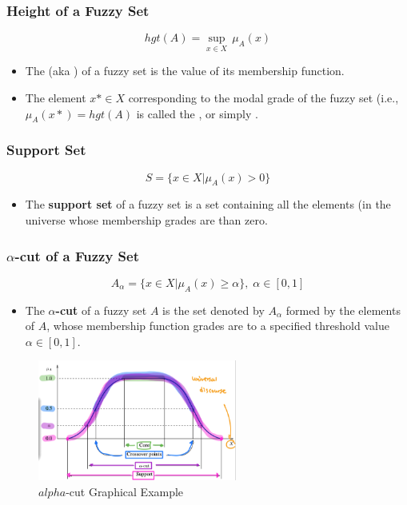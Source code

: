 \documentclass{tron}
\newcommand{\squeezeup}{\vspace{-2.5 mm}}
\begin{document}
\subsubsection{Height of a Fuzzy Set}
\begin{equation}
	hgt(A) = \underset{x \in X}{\sup} \, \mu_A(x)
\end{equation}
\squeezeup\squeezeup
\begin{itemize}
	\item The  (aka ) of a fuzzy set is the  value of its membership function.
	\item The element $x* \in X$ corresponding to the modal grade of the fuzzy set (i.e., $\mu_A(x*) = hgt(A)$ is called the , or simply .
\end{itemize}

\subsubsection{Support Set}
\begin{equation}
	S = \{x\in X | \mu_A(x) > 0 \}
\end{equation}
\squeezeup\squeezeup\squeezeup
\begin{itemize}
	\item The \textbf{support set} of a fuzzy set is a  set containing all the elements (in the universe whose membership grades are  than zero.
\end{itemize}

\subsubsection{$\alpha$-cut of a Fuzzy Set}
\begin{equation}
 	A_{\alpha} = \{x\in X | \mu_A(x) \geq \alpha \}, \; \alpha \in [0, 1]
\end{equation}
\squeezeup\squeezeup\squeezeup
\begin{itemize}
	\item The \textbf{$\alpha$-cut} of a fuzzy set $A$ is the  set denoted by $A_{\alpha}$ formed by the elements of $A$, whose membership function grades are  to a specified threshold value $\alpha \in [0, 1]$.
\end{itemize}

\begin{figure}[H]
	\centering
	\includegraphics[height=150px]{Figs/Fuzzy/alpha-cut}
	\caption{$alpha$-cut Graphical Example}
	\label{fig:fuzzy:alpha-cut:ex}
\end{figure}
\end{document}
